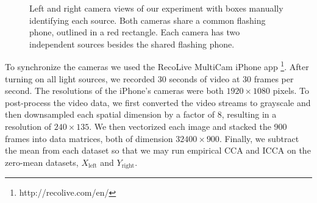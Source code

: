 \begin{figure}
  \begin{center}
    \caption{Left and right camera views of our experiment with boxes manually identifying
      each source. Both cameras share a common flashing phone, outlined in a red
      rectangle. Each camera has two independent sources besides the shared flashing
      phone.}
    \label{fig:chpt4:flashing_sources}
  \end{center}
\end{figure}


To synchronize the cameras we used the RecoLive MultiCam iPhone app
\footnote{http://recolive.com/en/}. After turning on all light sources, we recorded 30
seconds of video at 30 frames per second. The resolutions of the iPhone's cameras were
both $1920\times 1080$ pixels. To post-process the video data, we first converted the
video streams to grayscale and then downsampled each spatial dimension by a factor of 8,
resulting in a resolution of $240\times 135$. We then vectorized each image and stacked
the 900 frames into data matrices, both of dimension $32400 \times 900$. Finally, we
subtract the mean from each dataset so that we may run empirical CCA and ICCA on the
zero-mean datasets, $X_{\text{left}}$ and $Y_{\text{right}}$.


